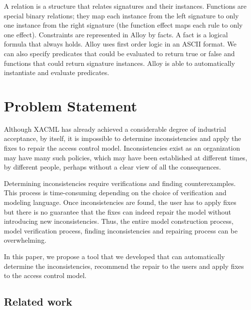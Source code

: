 \documentclass{acm_proc_article-sp}
\begin{document}
A relation is a structure that relates signatures and their instances. Functions are special binary relations; they map each instance from the left signature to only one instance from the right signature (the function effect maps each rule to only one effect). Constraints are represented in Alloy by facts. A fact is a logical formula that always holds. Alloy uses first order logic in an ASCII format. We can also specify predicates that could be evaluated to return true or false and functions that could return signature instances. Alloy is able to automatically instantiate and evaluate predicates.

\section{Problem Statement}

Although XACML has already achieved a considerable degree of industrial acceptance, by itself, it is impossible to determine inconsistencies and apply the fixes to repair the access control model. Inconsistencies exist as an organization may have many such policies, which may have been established at different times, by different people, perhaps without a clear view of all the consequences. 

Determining inconsistencies require verifications and finding counterexamples. This process is time-consuming depending on the choice of verification and modeling language. Once inconsistencies are found, the user has to apply fixes but there is no guarantee that the fixes can indeed repair the model without introducing new inconsistencies. Thus, the entire model construction process, model verification process, finding inconsistencies and repairing process can be overwhelming.

In this paper, we propose a tool that we developed that can automatically determine the inconsistencies, recommend the repair to the users and apply fixes to the access control model.

\subsection{Related work}
\end{document}
